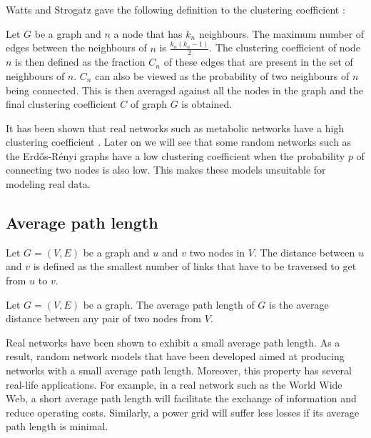 Watts and Strogatz gave the following definition to the clustering coefficient \cite{watts1998collective}:
\begin{mydef}
 Let $G$ be a graph and $n$ a node that has $k_n $ neighbours. The maximum number of edges between the neighbours of $n$ is $
\frac{k_n (k_n - 1)}{2} $. The clustering coefficient of node $n$ is then defined 
as the fraction $ C_n $ of these edges that
are present in the set of neighbours of $n$. $ C_n $ can also be viewed as the
probability of two neighbours of $n$ being connected. This is then averaged
against all the nodes in the graph and the final clustering coefficient $C$ of
graph $G$ is obtained.  
\end{mydef}

It has been shown that real networks such as metabolic networks have a high clustering coefficient \cite{ravasz2002hierarchical}. Later on we will see that some random networks such as the Erd\H{o}s-R\'{e}nyi graphs have a low clustering coefficient when the
probability $p$ of connecting two nodes is also low. This makes these models unsuitable for modeling real data.

\subsection{Average path length}

\begin{mydef}
 Let $G =(V,E)$ be a graph and $u$ and $v$ two nodes in $V$. The distance between $u$ and $v$ is defined as the smallest number of links that have to be traversed to get from $u$ to $v$.
\end{mydef}

\begin{mydef}
 Let $G =(V,E)$ be a graph. The average path length of $G$ is the average distance between any pair of two nodes from $V$. 
\end{mydef}

Real networks have been shown to exhibit a small average path length. As a result, random network models that have been developed aimed at producing networks with a small average path length. Moreover, this property has several real-life applications. For example, in a real network such as the World Wide Web, a short average path length will facilitate the exchange of information and reduce operating costs. Similarly, a power grid will suffer less losses if its average path length is minimal.  \\


